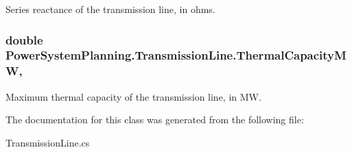 Series reactance of the transmission line, in ohms. 

\subsubsection[{\texorpdfstring{Thermal\+Capacity\+MW}{ThermalCapacityMW}}]{\setlength{\rightskip}{0pt plus 5cm}double Power\+System\+Planning.\+Transmission\+Line.\+Thermal\+Capacity\+MW\hspace{0.3cm}{\ttfamily [get]}, {\ttfamily [set]}}\hypertarget{class_power_system_planning_1_1_transmission_line_a0b11d55d8f8c39bb3f49133f02091f3c}{}\label{class_power_system_planning_1_1_transmission_line_a0b11d55d8f8c39bb3f49133f02091f3c}


Maximum thermal capacity of the transmission line, in MW. 



The documentation for this class was generated from the following file\+:\begin{DoxyCompactItemize}
\item 
Transmission\+Line.\+cs\end{DoxyCompactItemize}

